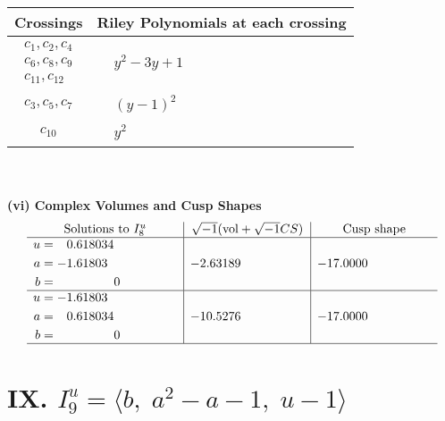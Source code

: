\documentclass[1p]{elsarticle_modified}
\theoremstyle{definition}
\newcommand{\I}{\sqrt{-1}}
\begin{document}
\begin{tabular}{m{50pt}|m{274pt}}
Crossings & \hspace{64pt}Riley Polynomials at each crossing \\
\hline $$\begin{aligned}c_{1},c_{2},c_{4}\\c_{6},c_{8},c_{9}\\c_{11},c_{12}\end{aligned}$$&$\begin{aligned}
&y^2-3 y+1
\end{aligned}$\\
\hline $$\begin{aligned}c_{3},c_{5},c_{7}\end{aligned}$$&$\begin{aligned}
&(y-1)^2
\end{aligned}$\\
\hline $$\begin{aligned}c_{10}\end{aligned}$$&$\begin{aligned}
&y^2
\end{aligned}$\\
\hline
\end{tabular}\\~\\
\newpage\flushleft \textbf{(vi) Complex Volumes and Cusp Shapes}
$$\begin{array}{c|c|c}  
\text{Solutions to }I^u_{8}& \I (\text{vol} + \sqrt{-1}CS) & \text{Cusp shape}\\
 \hline 
\begin{aligned}
u &= \phantom{-}0.618034\phantom{ +0.000000I} \\
a &= -1.61803\phantom{ +0.000000I} \\
b &= \phantom{-0.000000 } 0\end{aligned}
 & -2.63189\phantom{ +0.000000I} & -17.0000\phantom{ +0.000000I} \\ \hline\begin{aligned}
u &= -1.61803\phantom{ +0.000000I} \\
a &= \phantom{-}0.618034\phantom{ +0.000000I} \\
b &= \phantom{-0.000000 } 0\end{aligned}
 & -10.5276\phantom{ +0.000000I} & -17.0000\phantom{ +0.000000I}\\
 \hline 
 \end{array}$$\newpage\newpage\renewcommand{\arraystretch}{1}
\centering \section*{IX. $I^u_{9}= \langle b,\;a^2- a-1,\;u-1 \rangle$}
\end{document}
